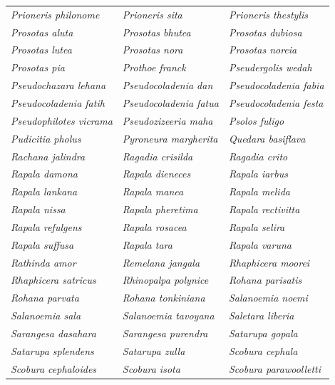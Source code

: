 \documentclass[runningheads]{llncs}
\begin{document}
\begin{longtable}{lll}
\textit{Prioneris philonome} & \textit{Prioneris sita} & \textit{Prioneris thestylis} \\
\textit{Prosotas aluta} & \textit{Prosotas bhutea} & \textit{Prosotas dubiosa} \\
\textit{Prosotas lutea} & \textit{Prosotas nora} & \textit{Prosotas noreia} \\
\textit{Prosotas pia} & \textit{Prothoe franck} & \textit{Pseudergolis wedah} \\
\textit{Pseudochazara lehana} & \textit{Pseudocoladenia dan} & \textit{Pseudocoladenia fabia} \\
\textit{Pseudocoladenia fatih} & \textit{Pseudocoladenia fatua} & \textit{Pseudocoladenia festa} \\
\textit{Pseudophilotes vicrama} & \textit{Pseudozizeeria maha} & \textit{Psolos fuligo} \\
\textit{Pudicitia pholus} & \textit{Pyroneura margherita} & \textit{Quedara basiflava} \\
\textit{Rachana jalindra} & \textit{Ragadia crisilda} & \textit{Ragadia crito} \\
\textit{Rapala damona} & \textit{Rapala dieneces} & \textit{Rapala iarbus} \\
\textit{Rapala lankana} & \textit{Rapala manea} & \textit{Rapala melida} \\
\textit{Rapala nissa} & \textit{Rapala pheretima} & \textit{Rapala rectivitta} \\
\textit{Rapala refulgens} & \textit{Rapala rosacea} & \textit{Rapala selira} \\
\textit{Rapala suffusa} & \textit{Rapala tara} & \textit{Rapala varuna} \\
\textit{Rathinda amor} & \textit{Remelana jangala} & \textit{Rhaphicera moorei} \\
\textit{Rhaphicera satricus} & \textit{Rhinopalpa polynice} & \textit{Rohana parisatis} \\
\textit{Rohana parvata} & \textit{Rohana tonkiniana} & \textit{Salanoemia noemi} \\
\textit{Salanoemia sala} & \textit{Salanoemia tavoyana} & \textit{Saletara liberia} \\
\textit{Sarangesa dasahara} & \textit{Sarangesa purendra} & \textit{Satarupa gopala} \\
\textit{Satarupa splendens} & \textit{Satarupa zulla} & \textit{Scobura cephala} \\
\textit{Scobura cephaloides} & \textit{Scobura isota} & \textit{Scobura parawoolletti} \\

\end{longtable}
\end{document}
